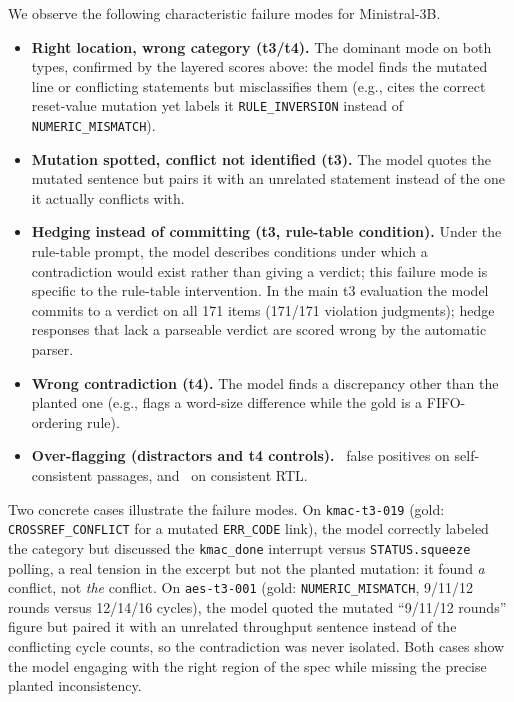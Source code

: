 \documentclass[11pt]{article}
\begin{document}
We observe the following characteristic failure modes for Ministral-3B.
\begin{itemize}
\item \textbf{Right location, wrong category (t3/t4).} The dominant mode on both types, confirmed by the layered scores above: the model finds the mutated line or conflicting statements but misclassifies them (e.g., cites the correct reset-value mutation yet labels it \texttt{RULE\_INVERSION} instead of \texttt{NUMERIC\_MISMATCH}).
\item \textbf{Mutation spotted, conflict not identified (t3).} The model quotes the mutated sentence but pairs it with an unrelated statement instead of the one it actually conflicts with.
\item \textbf{Hedging instead of committing (t3, rule-table condition).} Under the rule-table prompt, the model describes conditions under which a contradiction would exist rather than giving a verdict; this failure mode is specific to the rule-table intervention. In the main t3 evaluation the model commits to a verdict on all 171 items (171/171 violation judgments); hedge responses that lack a parseable verdict are scored wrong by the automatic parser.
\item \textbf{Wrong contradiction (t4).} The model finds a discrepancy other than the planted one (e.g., flags a word-size difference while the gold is a FIFO-ordering rule).
\item \textbf{Over-flagging (distractors and t4 controls).} \DistrFPR\ false positives on self-consistent passages, and \CtrlFPR\ on consistent RTL.
\end{itemize}

Two concrete cases illustrate the failure modes. On \texttt{kmac-t3-019} (gold: \texttt{CROSSREF\_CONFLICT} for a mutated \texttt{ERR\_CODE} link), the model correctly labeled the category but discussed the \texttt{kmac\_done} interrupt versus \texttt{STATUS.squeeze} polling, a real tension in the excerpt but not the planted mutation: it found \emph{a} conflict, not \emph{the} conflict. On \texttt{aes-t3-001} (gold: \texttt{NUMERIC\_MISMATCH}, 9/11/12 rounds versus 12/14/16 cycles), the model quoted the mutated ``9/11/12 rounds'' figure but paired it with an unrelated throughput sentence instead of the conflicting cycle counts, so the contradiction was never isolated. Both cases show the model engaging with the right region of the spec while missing the precise planted inconsistency.
\end{document}
